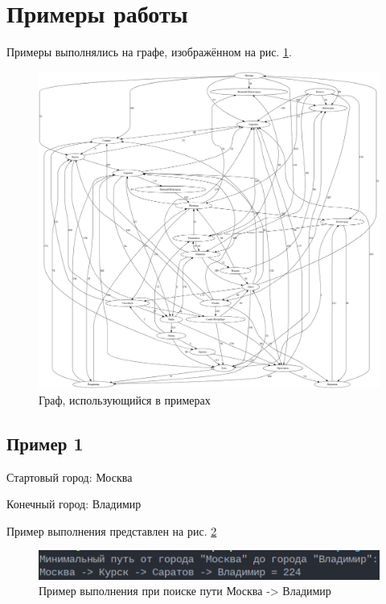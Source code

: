 \section{Примеры работы}

Примеры выполнялись на графе,
изображённом на рис. \ref{fig:sample_graph}.

\begin{figure}[H]
    \centering
    \includegraphics[width=\linewidth]{photo/sample_graph}
    \caption{Граф, использующийся в примерах}
    \label{fig:sample_graph}
\end{figure}

\subsection*{Пример 1}

Стартовый город: Москва

Конечный город: Владимир

Пример выполнения представлен на рис. \ref{fig:example_1}

\begin{figure}[H]
    \centering
    \includegraphics[width=0.7\linewidth]{photo/example_1}
    \caption{Пример выполнения при поиске пути Москва -> Владимир}
    \label{fig:example_1}
\end{figure}


